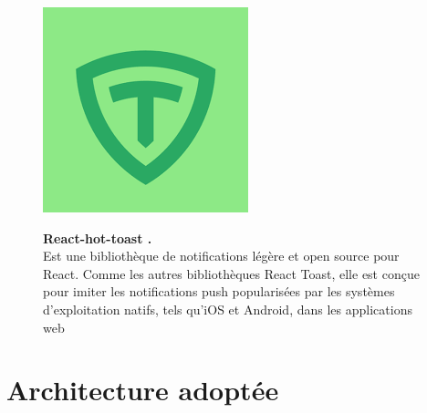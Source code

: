 \begin{figure}[H]
    \centering
    \begin{minipage}[c]{0.3\textwidth}
        \includegraphics[width=\linewidth]{projet/images/diagramme de sequance/images/toast.png}
    \end{minipage}
    \hspace{1cm}
    \begin{minipage}[c]{0.6\textwidth}
        \textbf{React-hot-toast .}\\[0.5em]
    Est une bibliothèque de notifications légère et open source pour React. Comme les autres bibliothèques React Toast, elle est conçue pour imiter les notifications push popularisées par les systèmes d'exploitation natifs, tels qu'iOS et Android, dans les applications web \cite{ref26}
    \end{minipage}
\end{figure}
\section{Architecture adoptée}
